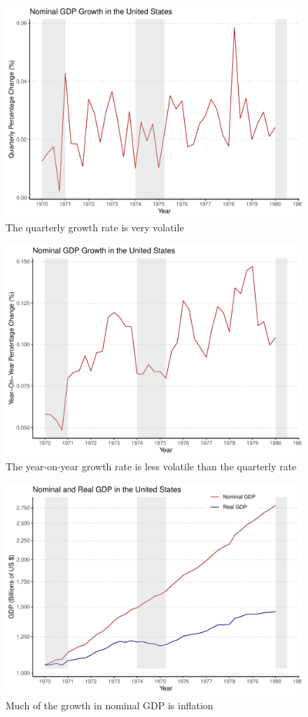 \documentclass[12pt]{article}
\begin{document}
\begin{figure}[!htb]
\includegraphics[height=0.4\textheight]{plot-gdp-nominal-growth-q-nber}
\caption*{The quarterly growth rate is very volatile}
\end{figure}

\begin{figure}[!htb]
\includegraphics[height=0.4\textheight]{plot-gdp-nominal-growth-yoy-nber}
\caption*{The year-on-year growth rate is less volatile than the quarterly rate}
\end{figure}

\begin{figure}[!htb]
\includegraphics[height=0.4\textheight]{plot-gdp-nominal-real-logscale-nber}
\caption*{Much of the growth in nominal GDP is inflation}
\end{figure}
\end{document}

